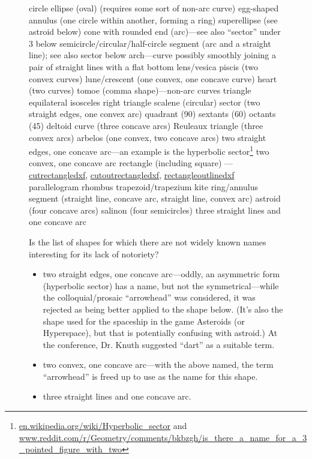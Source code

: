 \documentclass{ltxdoc}
\begin{document}
\begin{figure}
\begin{outline}
   \2 circle
   \2 ellipse (oval) (requires some sort of non-arc curve)
      \3 egg-shaped
   \2 annulus (one circle within another, forming  a ring)
   \2 superellipse (see astroid below)
   \2 cone with rounded end (arc)—see also ``sector'' under 3 below
   \2 semicircle/circular/half-circle segment (arc and a straight line); see also sector below
   \2 arch---curve possibly smoothly joining a  pair of straight lines with a flat bottom
   \2 lens/vesica piscis (two convex curves)
   \2 lune/crescent (one convex, one concave  curve)
   \2 heart (two curves)
   \2 tomoe (comma shape)---non-arc curves
   \2 triangle
      \3 equilateral
      \3 isosceles
      \3 right triangle
      \3 scalene
   \2 (circular) sector (two straight edges, one convex arc)
      \3 quadrant (90\textdegree)
      \3 sextants (60\textdegree)
      \3 octants (45\textdegree)
   \2 deltoid curve (three concave arcs)
   \2  Reuleaux triangle (three convex arcs)
   \2 arbelos (one convex, two concave arcs)
   \2 two straight edges, one concave arc---an example is the hyperbolic sector\footnote{\url{en.wikipedia.org/wiki/Hyperbolic_sector} and
 \url{www.reddit.com/r/Geometry/comments/bkbzgh/is_there_a_name_for_a_3_pointed_figure_with_two}}
   \2 two convex, one concave arc
   \2 rectangle (including square) --- \hyperref[routine:cutrectangledxf]{cutrectangledxf},
                                       \hyperref[routine:cutoutrectangledxf]{cutoutrectangledxf},
                                       \hyperref[routine:rectangleoutlinedxf]{rectangleoutlinedxf} 
   \2 parallelogram
   \2 rhombus
   \2 trapezoid/trapezium
   \2 kite
   \2 ring/annulus segment (straight line, concave arc, straight line, convex arc)
   \2 astroid (four concave arcs)
   \2 salinon (four semicircles)
   \2 three straight lines and one concave arc
\end{outline}


Is the list of shapes for which there are not widely known names interesting for its lack of notoriety?

\begin{itemize}
 \item two straight edges, one concave arc—oddly, an asymmetric form (hyperbolic sector) has a name,
       but not the symmetrical---while the colloquial/prosaic “arrowhead” was considered, it was
       rejected as being better applied to the shape below. (It’s also the shape used for the
       spaceship in the game Asteroids (or Hyperspace), but that  is potentially confusing with
       astroid.) At the  conference, Dr. Knuth suggested “dart” as a suitable term.
 \item two convex, one concave arc—with the above named, the term “arrowhead” is freed up to use
       as the name for this shape.
 \item three straight lines and one concave arc.
 \end{itemize}


\end{figure}
\end{document}
